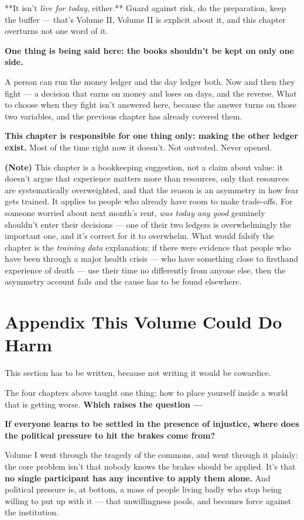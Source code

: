 \documentclass[11pt,a4paper]{article}
\begin{document}
**It isn't \textit{live for today}, either.** Guard against risk, do the preparation, keep the buffer --- that's Volume II, Volume II is explicit about it, and this chapter overturns not one word of it.

\textbf{One thing is being said here: the books shouldn't be kept on only one side.}

A person can run the money ledger and the day ledger both. Now and then they fight --- a decision that earns on money and loses on days, and the reverse. What to choose when they fight isn't answered here, because the answer turns on those two variables, and the previous chapter has already covered them.

\textbf{This chapter is responsible for one thing only: making the other ledger exist.} Most of the time right now it doesn't. Not outvoted. Never opened.

\textbf{(Note)} This chapter is a bookkeeping suggestion, not a claim about value: it doesn't argue that experience matters more than resources, only that resources are systematically overweighted, and that the reason is an asymmetry in how fear gets trained. It applies to people who already have room to make trade-offs. For someone worried about next month's rent, \textit{was today any good} genuinely shouldn't enter their decisions --- one of their two ledgers is overwhelmingly the important one, and it's correct for it to overwhelm. What would falsify the chapter is the \textit{training data} explanation: if there were evidence that people who have been through a major health crisis --- who have something close to firsthand experience of death --- use their time no differently from anyone else, then the asymmetry account fails and the cause has to be found elsewhere.

\section{Appendix \textperiodcentered{} This Volume Could Do Harm}

This section has to be written, because not writing it would be cowardice.

The four chapters above taught one thing: how to place yourself inside a world that is getting worse. \textbf{Which raises the question ---}

\textbf{If everyone learns to be settled in the presence of injustice, where does the political pressure to hit the brakes come from?}

Volume I went through the tragedy of the commons, and went through it plainly: the core problem isn't that nobody knows the brakes should be applied. It's that \textbf{no single participant has any incentive to apply them alone.} And political pressure is, at bottom, a mass of people living badly who stop being willing to put up with it --- that unwillingness pools, and becomes force against the institution.
\end{document}
